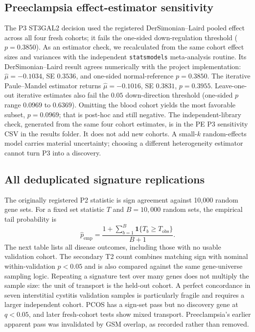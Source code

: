 \documentclass[11pt,a4paper]{article}
\begin{document}
\subsection{Preeclampsia effect-estimator sensitivity}
The P3 ST3GAL2 decision used the registered DerSimonian--Laird pooled effect across all four fresh cohorts; it fails the one-sided down-regulation threshold ($p=0.3850$). As an estimator check, we recalculated from the same cohort effect sizes and variances with the independent \texttt{statsmodels} meta-analysis routine. Its DerSimonian--Laird result agrees numerically with the project implementation: $\hat\mu=-0.1034$, SE $0.3536$, and one-sided normal-reference $p=0.3850$. The iterative Paule--Mandel estimator returns $\hat\mu=-0.1016$, SE $0.3831$, $p=0.3955$. Leave-one-out iterative estimates also fail the $0.05$ down-direction threshold (one-sided $p$ range $0.0969$ to $0.6369$). Omitting the blood cohort yields the most favorable subset, $p=0.0969$; that is post-hoc and still negative. The independent-library check, generated from the same four cohort estimates, is in the PE P3 sensitivity CSV in the results folder. It does not add new cohorts. A small-$k$ random-effects model carries material uncertainty; choosing a different heterogeneity estimator cannot turn P3 into a discovery.

\subsection{All deduplicated signature replications}
The originally registered P2 statistic is sign agreement against 10,000 random gene sets. For a fixed set statistic $T$ and $B=10{,}000$ random sets, the empirical tail probability is
\begin{equation}\hat p_{\mathrm{emp}}=\frac{1+\sum_{b=1}^{B}\mathbf 1\{T_b\geq T_{\mathrm{obs}}\}}{B+1}.\end{equation}
 The next table lists all disease outcomes, including those with no usable validation cohort. The secondary T2 count combines matching sign with nominal within-validation $p<0.05$ and is also compared against the same gene-universe sampling logic. Repeating a signature test over many genes does not multiply the sample size: the unit of transport is the held-out cohort. A perfect concordance in seven interstitial cystitis validation samples is particularly fragile and requires a larger independent cohort. PCOS has a sign-set pass but no discovery gene at $q<0.05$, and later fresh-cohort tests show mixed transport. Preeclampsia's earlier apparent pass was invalidated by GSM overlap, as recorded rather than removed.

\end{document}
